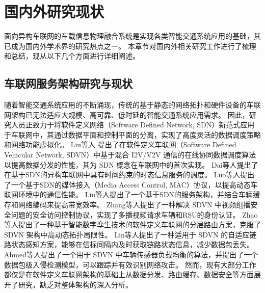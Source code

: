 \section{国内外研究现状}\label{section 1-3}

面向异构车联网的车载信息物理融合系统是实现各类智能交通系统应用的基础，其已成为国内外学术界的研究热点之一。
本章节对国内外相关研究工作进行了梳理和总结，现从以下几个方面进行详细阐述。

\subsection{车联网服务架构研究与现状}

随着智能交通系统应用的不断涌现，传统的基于静态的网络拓扑和硬件设备的车联网架构已无法适应大规模、高可靠、低时延的智能交通系统应用需求。
因此，研究人员正致力于将软件定义网络（Software Defined Network, SDN）新范式应用于车联网中，其通过数据平面和控制平面的分离，实现了高度灵活的数据调度策略和网络功能虚拟化。
Liu等人 \cite{liu2016cooperative} 提出了在软件定义车联网（Software Defined Vehicular Network, SDVN）中基于混合 I2V/V2V 通信的在线协同数据调度算法以提高数据分发的性能，其为 SDN 概念在车联网中的首次实现。
Dai等人\cite{dai2018cooperative}提出了在基于SDN的异构车联网中具有时间约束的时态信息服务的调度。
Luo等人\cite{luo2018sdnmac}提出了一个基于SDN的媒体接入（Media Access Control, MAC）协议，以提高动态车联网环境中的通信性能。
Liu等人\cite{liu2018coding}提出了一个基于SDN的服务架构，并结合车辆缓存和网络编码来提高带宽效率。
Zhang等人\cite{zhang2022ac-sdvn}提出了一种解决 SDVN 中视频组播安全问题的安全访问控制协议，实现了多播视频请求车辆和RSU的身份认证。
Zhao等人\cite{zhao2022elite}提出了一种基于智能数字孪生技术的软件定义车联网的分层路由方案，克服了 SDVN 架构中高动态拓扑局限性。
Lin等人\cite{lin2023alps}提出了一种适用于 SDVN 的自适应链路状态感知方案，能够在信标间隔内及时获取链路状态信息，减少数据包丢失。
Ahmed等人\cite{ahmed2023deep}提出了一个用于 SDVN 中车辆传感器负载均衡的算法，并提出了一个数据包级入侵检测模型，可以跟踪并有效识别网络攻击。
然而，现有大部分工作都仅是在软件定义车联网架构的基础上从数据分发、路由缓存、数据安全等方面展开了研究，缺乏对整体架构的深入分析。

